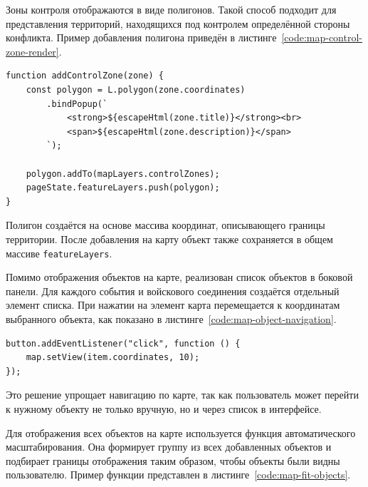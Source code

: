 Зоны контроля отображаются в виде полигонов. Такой способ подходит для представления территорий, находящихся под контролем определённой стороны конфликта. Пример добавления полигона приведён в листинге~\ref{code:map-control-zone-render}.

\begin{code}
\label{code:map-control-zone-render}
\vspace{-0.75cm}
\begin{verbatim}
function addControlZone(zone) {
    const polygon = L.polygon(zone.coordinates)
        .bindPopup(`
            <strong>${escapeHtml(zone.title)}</strong><br>
            <span>${escapeHtml(zone.description)}</span>
        `);

    polygon.addTo(mapLayers.controlZones);
    pageState.featureLayers.push(polygon);
}
\end{verbatim}
\end{code}

Полигон создаётся на основе массива координат, описывающего границы территории. После добавления на карту объект также сохраняется в общем массиве \texttt{featureLayers}.

Помимо отображения объектов на карте, реализован список объектов в боковой панели. Для каждого события и войскового соединения создаётся отдельный элемент списка. При нажатии на элемент карта перемещается к координатам выбранного объекта, как показано в листинге~\ref{code:map-object-navigation}.

\begin{code}
\label{code:map-object-navigation}
\vspace{-0.75cm}
\begin{verbatim}
button.addEventListener("click", function () {
    map.setView(item.coordinates, 10);
});
\end{verbatim}
\end{code}

Это решение упрощает навигацию по карте, так как пользователь может перейти к нужному объекту не только вручную, но и через список в интерфейсе.

Для отображения всех объектов на карте используется функция автоматического масштабирования. Она формирует группу из всех добавленных объектов и подбирает границы отображения таким образом, чтобы объекты были видны пользователю. Пример функции представлен в листинге~\ref{code:map-fit-objects}.

